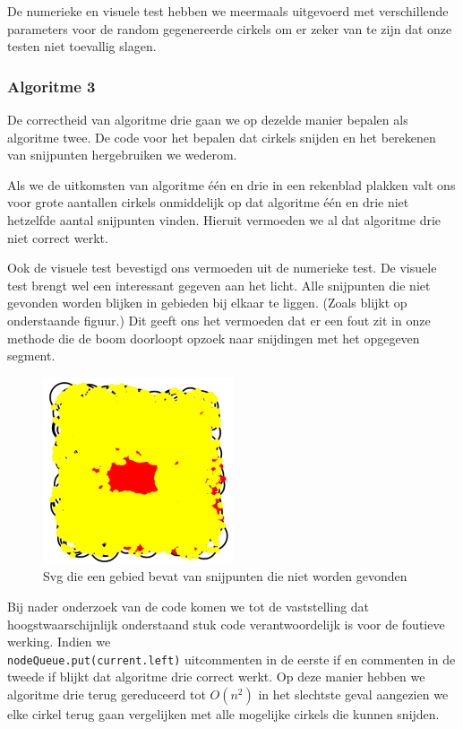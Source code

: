 \documentclass[11pt,a4paper]{article}
\begin{document}
De numerieke en visuele test hebben we meermaals uitgevoerd met verschillende parameters voor de random gegenereerde cirkels om er zeker van te zijn dat onze testen niet toevallig slagen.

\subsubsection*{Algoritme 3}

De correctheid van algoritme drie gaan we op dezelde manier bepalen als algoritme twee. De code voor het bepalen dat cirkels snijden en het berekenen van snijpunten hergebruiken we wederom.

Als we de uitkomsten van algoritme \'e\'en en drie in een rekenblad plakken valt ons voor grote aantallen cirkels onmiddelijk op dat algoritme \'e\'en en drie niet hetzelfde aantal snijpunten vinden. Hieruit vermoeden we al dat algoritme drie niet correct werkt.

Ook de visuele test bevestigd ons vermoeden uit de numerieke test. De visuele test brengt wel een interessant gegeven aan het licht. Alle snijpunten die niet gevonden worden blijken in gebieden bij elkaar te liggen. (Zoals blijkt op onderstaande figuur.) Dit geeft ons het vermoeden dat er een fout zit in onze methode die de boom doorloopt opzoek naar snijdingen met het opgegeven segment.

\begin{figure}[H]
\centering
\includegraphics[width=0.5\textwidth]{gat_midden.png}
\caption*{Svg die een gebied bevat van snijpunten die niet worden gevonden}
\end{figure}

Bij nader onderzoek van de code komen we tot de vaststelling dat hoogstwaarschijnlijk onderstaand stuk code verantwoordelijk is voor de foutieve werking. Indien we \\ \verb|nodeQueue.put(current.left)| uitcommenten in de eerste if en commenten in de tweede if blijkt dat algoritme drie correct werkt. Op deze manier hebben we algoritme drie terug gereduceerd tot $O(n^{2})$ in het slechtste geval aangezien we elke cirkel terug gaan vergelijken met alle mogelijke cirkels die kunnen snijden.
\end{document}
